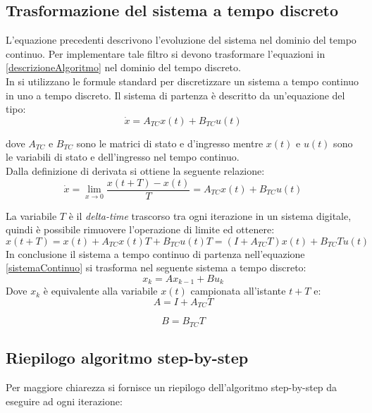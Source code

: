 \subsection{Trasformazione del sistema a tempo discreto}
L'equazione precedenti descrivono l'evoluzione del sistema nel dominio del tempo continuo. Per implementare tale filtro si devono trasformare l'equazioni in \ref{descrizioneAlgoritmo} nel dominio del tempo discreto. \\
In \cite{trackingThesis} si utilizzano le formule standard per discretizzare un sistema a tempo continuo in uno a tempo discreto. Il sistema di partenza è descritto da un'equazione del tipo:
\begin{equation}
\label{sistemaContinuo}
\dot{x}= A_{TC} x(t) + B_{TC} u(t)
\end{equation}

dove $A_{TC}$ e $B_{TC}$ sono le matrici di stato e d'ingresso mentre $x(t)$ e $u(t)$ sono le variabili di stato e dell'ingresso nel tempo continuo.\\
Dalla definizione di derivata si ottiene la seguente relazione:
\begin{equation}
\dot{x} = \lim\limits_{x\rightarrow0} \dfrac{x(t+T)-x(t)}{T} = A_{TC}x(t) + B_{TC}u(t)
\end{equation}

La variabile $T$ è il \textit{delta-time} trascorso tra ogni iterazione in un sistema digitale, quindi è possibile rimuovere l'operazione di limite ed ottenere:
\begin{equation}
x(t+T)=x(t)+ A_{TC}x(t)T + B_{TC}u(t)T = (I + A_{TC}T)x(t) + B_{TC}Tu(t)
\end{equation}
In conclusione il sistema a tempo continuo di partenza nell'equazione \ref{sistemaContinuo} si trasforma nel seguente sistema a tempo discreto:
\begin{equation}
x_k = A x_{k-1} + B u_k
\end{equation}
Dove $x_k$ è equivalente alla variabile $x(t)$ campionata all'istante $t + T$ e:
\begin{equation}
A = I + A_{TC}T
\end{equation}

\begin{equation}
B = B_{TC}T
\end{equation}

\subsection{Riepilogo algoritmo step-by-step}
\label{algoritmo}
Per maggiore chiarezza si fornisce un riepilogo dell'algoritmo step-by-step da eseguire ad ogni iterazione:

